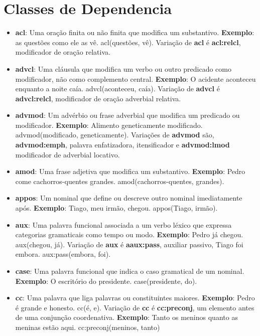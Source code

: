\apendices
\section{Classes de Dependencia}
\label{cap:classe_deprel}
\begin{itemize}

\item \textbf{acl}: Uma oração finita ou não finita que modifica um substantivo. \textbf{Exemplo}: as questões como ele as vê. acl(questões, vê). Variação de \textbf{acl} é \textbf{acl:relcl}, modificador de oração relativa.

\item\textbf{advcl}: Uma cláusula que modifica um verbo ou outro predicado como modificador, não como complemento central. \textbf{Exemplo}: O acidente aconteceu enquanto a noite caía. advcl(aconteceu, caía). Variação de \textbf{advcl} é \textbf{advcl:relcl}, modificador de oração adverbial relativa.

\item\textbf{advmod}: Um advérbio ou frase adverbial que modifica um predicado ou modificador. \textbf{Exemplo}: Alimento geneticamente modificado. advmod(modificado, geneticamente). Variações de \textbf{advmod} são, \textbf{advmod:emph}, palavra enfatizadora, itensificador e \textbf{advmod:lmod} modificador de adverbial locativo.

\item\textbf{amod}: Uma frase adjetiva que modifica um substantivo. \textbf{Exemplo}: Pedro come cachorros-quentes grandes. amod(cachorros-quentes, grandes).

\item\textbf{appos}: Um nominal que define ou descreve outro nominal imediatamente após. \textbf{Exemplo}: Tiago, meu irmão, chegou. appos(Tiago, irmão).

\item\textbf{aux}: Uma palavra funcional associada a um verbo léxico que expressa categorias gramaticais como tempo ou modo. \textbf{Exemplo}: Pedro já chegou. aux(chegou, já). Variação de \textbf{aux} é \textbf{aaux:pass}, auxiliar passivo, Tiago foi embora. aux:pass(embora, foi).

\item\textbf{case}: Uma palavra funcional que indica o caso gramatical de um nominal. \textbf{Exemplo}: O escritório do presidente. case(presidente, do).

\item\textbf{cc}: Uma palavra que liga palavras ou constituintes maiores. \textbf{Exemplo}: Pedro é grande e honesto. cc(é, e). Variação de \textbf{cc} é \textbf{cc:preconj}, um elemento antes de uma conjunção coordenativa. \textbf{Exemplo}: Tanto os meninos quanto as meninas estão aqui. cc:preconj(meninos, tanto) 


\end{itemize}
